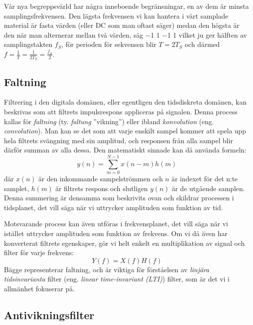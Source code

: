 \noindent
Vår nya begreppsvärld har några inneboende begränsningar, en av dem är minsta
samplingsfrekvensen.
Den lägsta frekvensen vi kan hantera i vårt samplade material är fasta värden
(eller DC som man oftast säger) medan den högsta är den när man alternerar
mellan två värden, säg \num{-1} \num{+1} \num{-1} \num{+1} vilket ju ger hälften
av samplingstakten \(f_S\), för perioden för sekvensen blir \(T = 2T_S\) och
därmed \(f=\frac{1}{T}=\frac{1}{2T_S}=\frac{f_S}{2}\).

\subsection{Faltning}

Filtrering i den digitala domänen, eller egentligen den tidsdiskreta domänen,
kan beskrivas som att filtrets impulsrespons appliceras på signalen. Denna
process kallas för \emph{faltning} (ty. \emph{faltung} ''vikning'') eller ibland
\emph{konvolution} (eng. \emph{convolution}).
Man kan se det som att varje enskilt sampel kommer att spela upp hela filtrets
svängning med sin amplitud, och responsen från alla sampel blir därför summan
av alla dessa.
Den matematiskt sinnade kan då använda formeln:
\[y(n) = \sum_{m=0}^{N-1} x(n-m)h(m)\]
där \(x(n)\) är den inkommande sampelströmmen och \(n\) är indexet för det
n:te samplet, \(h(m)\) är filtrets respons och slutligen \(y(n)\) är de utgående
samplen.
Denna summering är densamma som beskrivits ovan och skildrar processen
i tidsplanet, det vill säga när vi uttrycker amplituden som funktion av tid.

Motsvarande process kan även utföras i frekvensplanet, det vill säga när vi 
istället uttrycker amplituden som funktion av frekvens.
Om vi då även har konverterat filtrets egenskaper, gör vi helt enkelt en
multiplikation av signal och filter för varje frekvens:
\[Y(f) = X(f)H(f)\]
Bägge representerar faltning, och är viktiga för förståelsen av \emph{linjära
tidsinvarianta} filter (eng. \emph{linear time-invariant (LTI)}) filter,
som är det vi i allmänhet fokuserar på.

\subsection{Antivikningsfilter}

